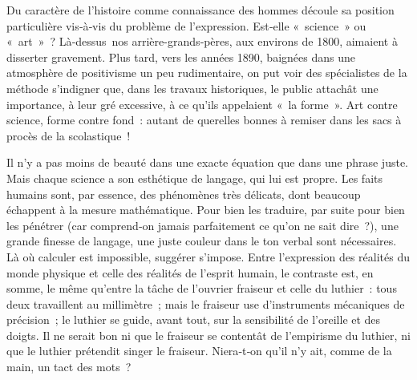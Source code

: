\documentclass[french,twoside]{book} %
\begin{document}
\noindent Du caractère de l’histoire comme connaissance des hommes découle sa position particulière vis‑à‑vis du problème de l’expression. Est‑elle « science » ou « art » ? Là‑dessus nos arrière-grands‑pères, aux environs de 1800, aimaient à disserter gravement. Plus tard, vers les années 1890, baignées dans une atmosphère de positivisme un peu rudimentaire, on put voir des spécialistes de la méthode s’indigner que, dans les travaux historiques, le public attachât une importance, à leur gré excessive, à ce qu’ils appelaient « la forme ». Art contre science, forme contre fond : autant de querelles bonnes à remiser dans les sacs à procès de la scolas­tique !\par
Il n’y a pas moins de beauté dans une exacte équation que dans une phrase juste. Mais chaque science a son esthétique de langage, qui lui est propre. Les faits humains sont, par essence, des phénomènes très délicats, dont beaucoup échappent à la mesure mathématique. Pour bien les traduire, par suite pour bien les pénétrer (car comprend‑on jamais parfaitement ce qu’on ne sait dire ?), une grande finesse de langage, une juste couleur dans le ton verbal sont nécessaires. Là où calculer est impos­sible, suggérer s’impose. Entre l’expression des réalités du monde physique et celle des réalités de l’esprit humain, le contraste est, en somme, le même qu’entre la tâche de l’ouvrier fraiseur et celle du luthier : tous deux tra­vaillent au millimètre ; mais le fraiseur use d’instruments mécaniques de précision ; le luthier se guide, avant tout, sur la sensibilité de l’oreille et des doigts. Il ne serait bon ni que le fraiseur se contentât de l’empirisme du luthier, ni que le luthier prétendit singer le fraiseur. Niera‑t‑on qu’il n’y ait, comme de la main, un tact des mots ?
\end{document}
